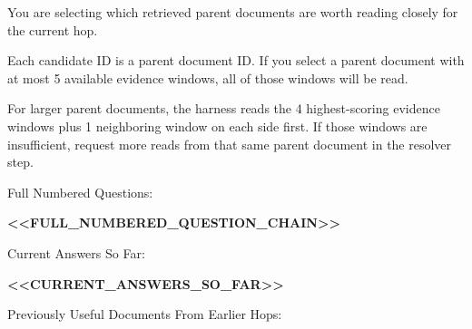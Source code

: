 \begin{tcolorbox}[colback=white, colframe=my-green, coltitle=black, parskip=5mm, title=\textbf{Document Choose with Sample Output}, halign=flush left, enhanced, breakable, skin first=enhanced, skin middle=enhanced, skin last=enhanced]
\begin{scriptsize}
\ttfamily
\setlength{\parindent}{0pt}
You are selecting which retrieved parent documents are worth reading closely for the current hop.\par
Each candidate ID is a parent document ID. If you select a parent document with at most 5 available evidence windows, all of those windows will be read.\par
For larger parent documents, the harness reads the 4 highest-scoring evidence windows plus 1 neighboring window on each side first. If those windows are insufficient, request more reads from that same parent document in the resolver step.\par
\mbox{}\par
Full Numbered Questions:\par
\textcolor{my-green}{\textbf{\textless{}\textless{}FULL\_NUMBERED\_QUESTION\_CHAIN\textgreater{}\textgreater{}}}\par
\mbox{}\par
Current Answers So Far:\par
\textcolor{my-green}{\textbf{\textless{}\textless{}CURRENT\_ANSWERS\_SO\_FAR\textgreater{}\textgreater{}}}\par
\mbox{}\par
Previously Useful Documents From Earlier Hops:\par
[\par
  \{\par
    "doc\_id": "\textcolor{my-green}{\textbf{\textless{}\textless{}PREVIOUSLY\_USEFUL\_DOC\_ID\textgreater{}\textgreater{}}}",\par
    "title": "\textcolor{my-green}{\textbf{\textless{}\textless{}PREVIOUSLY\_USEFUL\_DOCUMENT\_TITLE\textgreater{}\textgreater{}}}",\par
    "source": "\textcolor{my-green}{\textbf{\textless{}\textless{}SOURCE\_KIND\textgreater{}\textgreater{}}}",\par
    "why\_useful": "\textcolor{my-green}{\textbf{\textless{}\textless{}WHY\_THIS\_DOCUMENT\_HELPED\_EARLIER\textgreater{}\textgreater{}}}"\par
  \}\par
]\par
\mbox{}\par

\end{scriptsize}
\end{tcolorbox}
